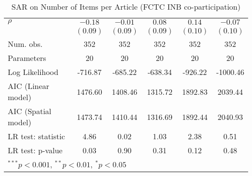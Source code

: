 \begin{table}[!h]
\begin{center}
\begin{tabular}{l c c c c c }
$\rho$                  & $-0.18$      & $-0.01$      & $0.08$       & $0.14$       & $-0.07$      \\
                        & $(0.09)$     & $(0.09)$     & $(0.09)$     & $(0.10)$     & $(0.10)$     \\
\midrule
Num. obs.               & 352          & 352          & 352          & 352          & 352          \\
Parameters              & 20           & 20           & 20           & 20           & 20           \\
Log Likelihood          & -716.87      & -685.22      & -638.34      & -926.22      & -1000.46     \\
AIC (Linear model)      & 1476.60      & 1408.46      & 1315.72      & 1892.83      & 2039.44      \\
AIC (Spatial model)     & 1473.74      & 1410.44      & 1316.69      & 1892.44      & 2040.93      \\
LR test: statistic      & 4.86         & 0.02         & 1.03         & 2.38         & 0.51         \\
LR test: p-value        & 0.03         & 0.90         & 0.31         & 0.12         & 0.48         \\
\bottomrule
\multicolumn{6}{l}{\scriptsize{$^{***}p<0.001$, $^{**}p<0.01$, $^*p<0.05$}}
\end{tabular}
\caption{SAR on Number of Items per Article (FCTC INB co-participation)}
\label{table:coefficients}
\end{center}
\end{table}
